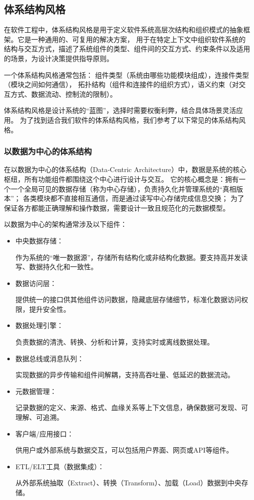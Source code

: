 \documentclass[12pt]{ctexart} %
\begin{document}
\subsection{体系结构风格}
在软件工程中，体系结构风格是用于定义软件系统高层次结构和组织模式的抽象框架。它是一种通用的、可复用的解决方案，
用于在特定上下文中组织软件系统的结构与交互方式，描述了系统组件的类型、组件间的交互方式、约束条件以及适用的场景，为设计决策提供指导原则。

一个体系结构风格通常包括：
组件类型（系统由哪些功能模块组成），连接件类型（模块之间如何通信），
拓扑结构（组件和连接件的组织方式），语义约束（对交互方式、数据流动、控制流的限制）。

体系结构风格是设计系统的“蓝图”，选择时需要权衡利弊，结合具体场景灵活应用。
为了找到适合我们软件的体系结构风格，我们参考了以下常见的体系结构风格。

\subsubsection{以数据为中心的体系结构}
在以数据为中心的体系结构（Data‑Centric Architecture）中，数据是系统的核心枢纽，所有功能组件都围绕这个中心进行设计与交互。
它的核心概念是：拥有一个一个全局可见的数据存储（称为中心存储），负责持久化并管理系统的“真相版本”；
各类模块都不直接相互通信，而是通过读写中心存储完成信息交换；
为了保证各方都能正确理解和操作数据，需要设计一致且规范化的元数据模型。

以数据为中心的架构通常涉及以下组件：
\begin{itemize}
  \item 中央数据存储：

  作为系统的“唯一数据源”，存储所有结构化或非结构化数据。要支持高并发读写、数据持久化和一致性。
  \item 数据访问层：
  
  提供统一的接口供其他组件访问数据，隐藏底层存储细节，标准化数据访问权限，提升安全性。
  \item 数据处理引擎：
  
  负责数据的清洗、转换、分析和计算，支持实时或离线数据处理。
  \item 数据总线或消息队列：
  
  实现数据的异步传输和组件间解耦，支持高吞吐量、低延迟的数据流动。
  \item 元数据管理：
  
  记录数据的定义、来源、格式、血缘关系等上下文信息，确保数据可发现、可理解、可追溯。
  \item 客户端/应用接口：
  
  供用户或外部系统与数据交互，可以包括用户界面、网页或API等组件。 
  \item ETL/ELT工具（数据集成）：
  
  从外部系统抽取（Extract）、转换（Transform）、加载（Load）数据到中央存储。
\end{itemize}
\end{document}
